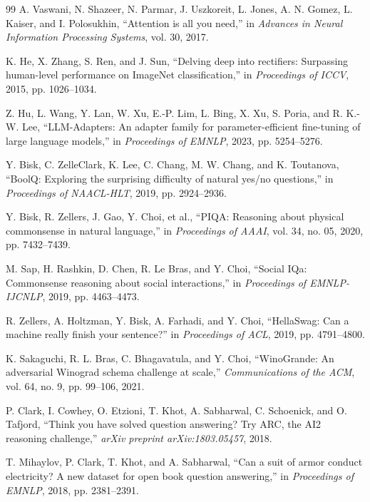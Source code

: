 ﻿\documentclass[UTF8,a4paper,11pt]{ctexart}
\begin{document}
\begin{thebibliography}{99}
A. Vaswani, N. Shazeer, N. Parmar, J. Uszkoreit, L. Jones, A. N. Gomez, L. Kaiser, and I. Polosukhin, ``Attention is all you need,'' in \emph{Advances in Neural Information Processing Systems}, vol. 30, 2017.

K. He, X. Zhang, S. Ren, and J. Sun, ``Delving deep into rectifiers: Surpassing human-level performance on ImageNet classification,'' in \emph{Proceedings of ICCV}, 2015, pp. 1026--1034.

Z. Hu, L. Wang, Y. Lan, W. Xu, E.-P. Lim, L. Bing, X. Xu, S. Poria, and R. K.-W. Lee, ``LLM-Adapters: An adapter family for parameter-efficient fine-tuning of large language models,'' in \emph{Proceedings of EMNLP}, 2023, pp. 5254--5276.

Y. Bisk, C. ZelleClark, K. Lee, C. Chang, M. W. Chang, and K. Toutanova, ``BoolQ: Exploring the surprising difficulty of natural yes/no questions,'' in \emph{Proceedings of NAACL-HLT}, 2019, pp. 2924--2936.

Y. Bisk, R. Zellers, J. Gao, Y. Choi, et al., ``PIQA: Reasoning about physical commonsense in natural language,'' in \emph{Proceedings of AAAI}, vol. 34, no. 05, 2020, pp. 7432--7439.

M. Sap, H. Rashkin, D. Chen, R. Le Bras, and Y. Choi, ``Social IQa: Commonsense reasoning about social interactions,'' in \emph{Proceedings of EMNLP-IJCNLP}, 2019, pp. 4463--4473.

R. Zellers, A. Holtzman, Y. Bisk, A. Farhadi, and Y. Choi, ``HellaSwag: Can a machine really finish your sentence?'' in \emph{Proceedings of ACL}, 2019, pp. 4791--4800.

K. Sakaguchi, R. L. Bras, C. Bhagavatula, and Y. Choi, ``WinoGrande: An adversarial Winograd schema challenge at scale,'' \emph{Communications of the ACM}, vol. 64, no. 9, pp. 99--106, 2021.

P. Clark, I. Cowhey, O. Etzioni, T. Khot, A. Sabharwal, C. Schoenick, and O. Tafjord, ``Think you have solved question answering? Try ARC, the AI2 reasoning challenge,'' \emph{arXiv preprint arXiv:1803.05457}, 2018.

T. Mihaylov, P. Clark, T. Khot, and A. Sabharwal, ``Can a suit of armor conduct electricity? A new dataset for open book question answering,'' in \emph{Proceedings of EMNLP}, 2018, pp. 2381--2391.


\end{thebibliography}
\end{document}
